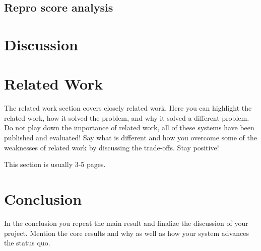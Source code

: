 \documentclass[a4paper,11pt,oneside]{report}
\theoremstyle{definition}
\begin{document}
\section{Repro score analysis}


\chapter{Discussion}
\label{chap:disc}



\chapter{Related Work}

The related work section covers closely related work. Here you can highlight
the related work, how it solved the problem, and why it solved a different
problem. Do not play down the importance of related work, all of these
systems have been published and evaluated! Say what is different and how
you overcome some of the weaknesses of related work by discussing the
trade-offs. Stay positive!

This section is usually 3-5 pages.


\chapter{Conclusion}

In the conclusion you repeat the main result and finalize the discussion of
your project. Mention the core results and why as well as how your system
advances the status quo.

\cleardoublepage
{}
{}
\printbibliography
\end{document}

